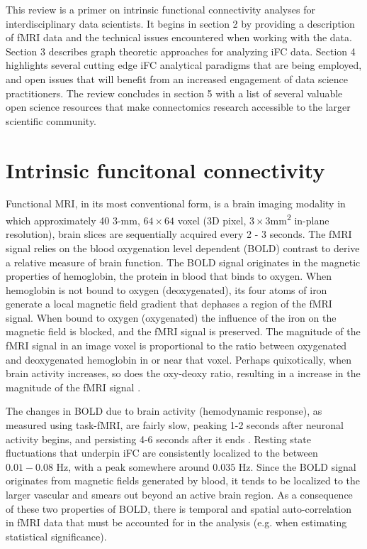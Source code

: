 This review is a primer on intrinsic functional connectivity analyses for interdisciplinary data scientists. It begins in section 2 by providing a description of fMRI data and the technical issues encountered when working with the data. Section 3 describes graph theoretic approaches for analyzing iFC data. Section 4 highlights several cutting edge iFC analytical paradigms that are being employed, and open issues that will benefit from an increased engagement of data science practitioners. The review concludes in section 5 with a list of several valuable open science resources that make connectomics research accessible to the larger scientific community.

\section{Intrinsic funcitonal connectivity}

Functional MRI, in its most conventional form, is a brain imaging modality in which approximately 40 3-\si{\milli\meter}, $64 \times 64$ voxel (3D pixel, $3\times3$\si{\milli\meter\squared} in-plane resolution), brain slices are sequentially acquired every 2 - 3 seconds. The fMRI signal relies on the blood oxygenation level dependent (BOLD) contrast to derive a relative measure of brain function. The BOLD signal originates in the magnetic properties of hemoglobin, the protein in blood that binds to oxygen. When hemoglobin is not bound to oxygen (deoxygenated), its four atoms of iron generate a local magnetic field gradient that dephases a region of the fMRI signal. When bound to oxygen (oxygenated) the influence of the iron on the magnetic field is blocked, and the fMRI signal is preserved. The magnitude of the fMRI signal in an image voxel is proportional to the ratio between oxygenated and deoxygenated hemoglobin in or near that voxel. Perhaps quixotically, when brain activity increases, so does the oxy-deoxy ratio, resulting in a increase in the magnitude of the fMRI signal \cite{fmribook}. 

The changes in BOLD due to brain activity (hemodynamic response), as measured using task-fMRI, are fairly slow, peaking 1-2 seconds after neuronal activity begins, and persisting 4-6 seconds after it ends \cite{fmribook}. Resting state fluctuations that underpin iFC are consistently localized to the between $0.01-0.08$ \si{\hertz}, with a peak somewhere around $0.035$ \si{\hertz}\cite{biswal,cordes}. Since the BOLD signal originates from magnetic fields generated by blood, it tends to be localized to the larger vascular and smears out beyond an active brain region. As a consequence of these two properties of BOLD, there is temporal and spatial auto-correlation in fMRI data that must be accounted for in the analysis (e.g. when estimating statistical significance).

